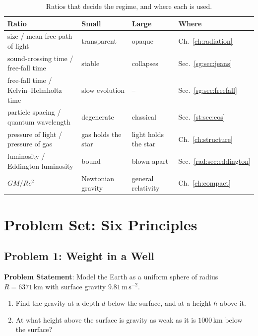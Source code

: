 \begin{table}[htbp]
	\centering
	\begin{tabular}{@{}l l l l@{}}
		\toprule
		\textbf{Ratio} & \textbf{Small} & \textbf{Large} & \textbf{Where} \\
		\midrule
		size / mean free path of light & transparent & opaque & Ch.~\ref{ch:radiation} \\
		sound-crossing time / free-fall time & stable & collapses & Sec.~\ref{sg:sec:jeans} \\
		free-fall time / Kelvin–Helmholtz time & slow evolution & -- & Sec.~\ref{sg:sec:freefall} \\
		particle spacing / quantum wavelength & degenerate & classical & Sec.~\ref{st:sec:eos} \\
		pressure of light / pressure of gas & gas holds the star & light holds the star & Ch.~\ref{ch:structure} \\
		luminosity / Eddington luminosity & bound & blown apart & Sec.~\ref{rad:sec:eddington} \\
		$GM/Rc^2$ & Newtonian gravity & general relativity & Ch.~\ref{ch:compact} \\
		\bottomrule
	\end{tabular}
	\caption{Ratios that decide the regime, and where each is used.}
	\label{pr:tab:ratios}
\end{table}

\section{Problem Set: Six Principles}

\subsection{Problem 1: Weight in a Well}
\label{pr:prob:well}

\textbf{Problem Statement}: Model the Earth as a uniform sphere of radius $R=6371\,\mathrm{km}$ with surface gravity $9.81\,\mathrm{m\,s^{-2}}$.
\begin{enumerate}[label=(\alph*)]
	\item Find the gravity at a depth $d$ below the surface, and at a height $h$ above it.
	\item At what height above the surface is gravity as weak as it is $1000\,\mathrm{km}$ below the surface?
\end{enumerate}

